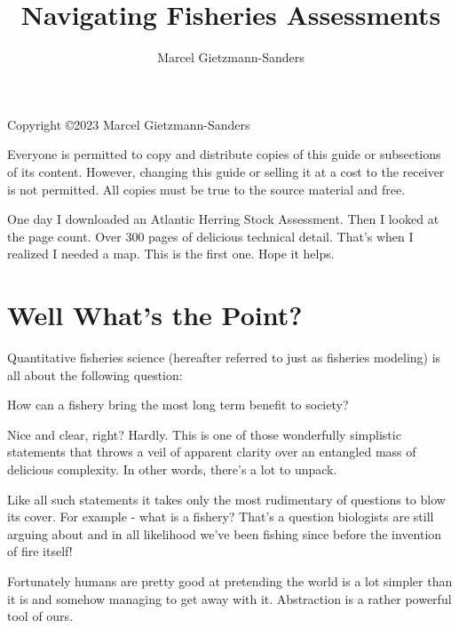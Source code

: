 \documentclass[11pt,a5paper]{book}
\title{Navigating Fisheries Assessments}
\author{Marcel Gietzmann-Sanders}
\date{}
\begin{document}
\maketitle
\newpage
\mbox{}
\vfill

\noindent
Copyright \copyright 2023 Marcel Gietzmann-Sanders
\newline

\noindent
Everyone is permitted to copy and distribute copies of this guide or subsections of its content. However, changing this guide or selling it at a cost to the receiver is not permitted. All copies must be true to the source material and free.
\newpage
\null
\newpage

One day I downloaded an Atlantic Herring Stock Assessment. Then I looked at the page count. Over 300 pages of delicious technical detail. That's when I realized I needed a map. This is the first one. Hope it helps.
\newpage
\null
\newpage

\tableofcontents
\newpage

\chapter{Well What's the Point?}

Quantitative fisheries science (hereafter referred to just as fisheries modeling) is all about the following question:
\newline

 \hangindent=1cm \noindent How can a fishery bring the most long term benefit to society?
\newline

Nice and clear, right? Hardly. This is one of those wonderfully simplistic statements that throws a veil of apparent clarity over an entangled mass of delicious complexity. In other words, there's a lot to unpack.
\newline

Like all such statements it takes only the most rudimentary of questions to blow its cover. For example - what is a fishery? That's a question biologists are still arguing about and in all likelihood we've been fishing since before the invention of fire itself! 
\newline

Fortunately humans are pretty good at pretending the world is a lot simpler than it is and somehow managing to get away with it. Abstraction is a rather powerful tool of ours.
\newline
\end{document}
